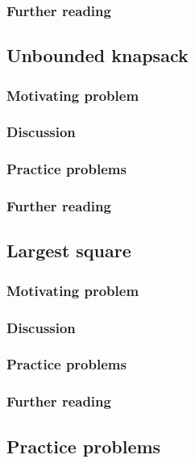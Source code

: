 \subsubsection*{Further reading}

\subsection{Unbounded knapsack}

\subsubsection*{Motivating problem}







\subsubsection*{Discussion}

\subsubsection*{Practice problems}

\subsubsection*{Further reading}

\subsection{Largest square}

\subsubsection*{Motivating problem}







\subsubsection*{Discussion}

\subsubsection*{Practice problems}

\subsubsection*{Further reading}

\subsection{Practice problems}
